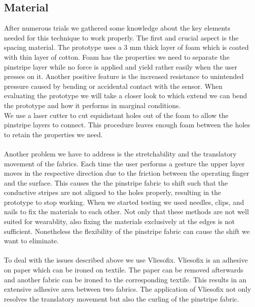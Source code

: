 \subsection{Material}
After numerous trials we gathered some knowledge about the key elements needed for this technique to work properly. The first and crucial aspect is the spacing material. The prototype uses a 3 mm thick layer of foam which is coated with thin layer of cotton. Foam has the properties we need to separate the pinstripe layer while no force is applied and yield rather easily when the user presses on it. Another positive feature is the increased resistance to unintended pressure caused by bending or accidental contact with the sensor. When evaluating the prototype we will take a closer look to which extend we can bend the prototype and how it performs in marginal conditions.
\\
We use a  laser cutter to cut equidistant holes out of the foam to allow the pinstripe layers to connect. This procedure leaves enough foam between the holes to retain the properties we need. 
\\ \\

 Another problem we have to address is the stretchability and the translatory movement of the fabrics. Each time the user performs a gesture the upper layer moves in the respective direction due to the friction between the operating finger and the surface. This causes the the pinstripe fabric to shift such that the conductive stripes are not aligned to the holes properly, resulting in the prototype to stop working.  When we started testing we used needles, clips, and nails to fix the materials to each other. Not only that these methods are not well suited for wearablity, also fixing the materials exclusively at the edges is not sufficient. Nonetheless the flexibility of the pinstripe fabric can cause the shift we want to eliminate. 
\\ \\
 To deal with the issues described above we use Vliesofix.  Vliesofix is an adhesive on paper which can be ironed on textile. The paper can be removed afterwards and another fabric can be ironed to the corresponding textile. This results in an extensive adhesive area between two fabrics. The application of Vliesofix not only resolves the translatory movement but also the curling of the pinstripe fabric.

